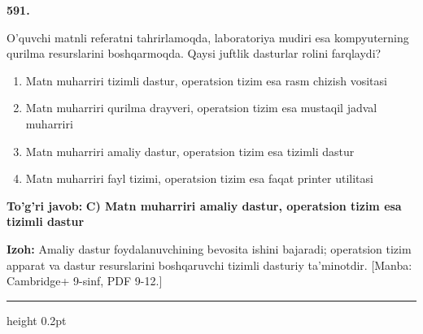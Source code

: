 \documentclass[10pt,a4paper]{article}
\begin{document}
{\bfseries\sffamily\color{ink} 591.}
\par
O'quvchi matnli referatni tahrirlamoqda, laboratoriya mudiri esa kompyuterning qurilma resurslarini boshqarmoqda. Qaysi juftlik dasturlar rolini farqlaydi?
\begin{enumerate}[label=\Alph*),leftmargin=9mm]
\item Matn muharriri tizimli dastur, operatsion tizim esa rasm chizish vositasi
\item Matn muharriri qurilma drayveri, operatsion tizim esa mustaqil jadval muharriri
\item Matn muharriri amaliy dastur, operatsion tizim esa tizimli dastur
\item Matn muharriri fayl tizimi, operatsion tizim esa faqat printer utilitasi
\end{enumerate}
\begin{tcolorbox}[enhanced,breakable,colback=teal!4,colframe=teal!60!black,boxrule=0.45pt,arc=1.2mm,left=2.7mm,right=2.7mm,top=1.8mm,bottom=1.8mm,before skip=2mm,after skip=2mm]
{\bfseries\sffamily\color{teal}To'g'ri javob:} \textbf{C) Matn muharriri amaliy dastur, operatsion tizim esa tizimli dastur}
\par\smallskip
{\bfseries Izoh:} Amaliy dastur foydalanuvchining bevosita ishini bajaradi; operatsion tizim apparat va dastur resurslarini boshqaruvchi tizimli dasturiy ta'minotdir. [Manba: Cambridge+ 9-sinf, PDF 9-12.]
\end{tcolorbox}
\vspace{2mm}\hrule height 0.2pt\vspace{3mm}
\end{document}
